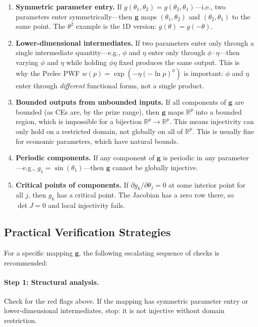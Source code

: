 \documentclass[11pt,a4paper]{article}
\theoremstyle{definition}
\begin{document}
\begin{enumerate}
    \item \textbf{Symmetric parameter entry.} If $g(\theta_1, \theta_2) =
    g(\theta_2, \theta_1)$---i.e., two parameters enter symmetrically---then
    $\mathbf{g}$ maps $(\theta_1, \theta_2)$ and $(\theta_2, \theta_1)$ to the
    same point. The $\theta^2$ example is the 1D version: $g(\theta) = g(-\theta)$.

    \item \textbf{Lower-dimensional intermediates.} If two parameters enter
    only through a single intermediate quantity---e.g., $\phi$ and $\eta$ enter
    only through $\phi \cdot \eta$---then varying $\phi$ and $\eta$ while holding
    $\phi\eta$ fixed produces the same output. This is why the Prelec PWF
    $w(p) = \exp(-\eta(-\ln p)^\phi)$ is important: $\phi$ and $\eta$ enter
    through \emph{different} functional forms, not a single product.

    \item \textbf{Bounded outputs from unbounded inputs.} If all components of
    $\mathbf{g}$ are bounded (as CEs are, by the prize range), then
    $\mathbf{g}$ maps $\mathbb{R}^p$ into a bounded region, which is
    impossible for a bijection $\mathbb{R}^p \to \mathbb{R}^p$. This means
    injectivity can only hold on a restricted domain, not globally on all of
    $\mathbb{R}^p$. This is usually fine for economic parameters, which have
    natural bounds.

    \item \textbf{Periodic components.} If any component of $\mathbf{g}$ is
    periodic in any parameter---e.g., $g_1 = \sin(\theta_1)$---then
    $\mathbf{g}$ cannot be globally injective.

    \item \textbf{Critical points of components.} If $\partial g_k / \partial
    \theta_j = 0$ at some interior point for all $j$, then $g_k$ has a critical
    point. The Jacobian has a zero row there, so $\det J = 0$ and local
    injectivity fails.
\end{enumerate}


\subsection{Practical Verification Strategies}

For a specific mapping $\mathbf{g}$, the following escalating sequence of
checks is recommended:

\paragraph{Step 1: Structural analysis.} Check for the red flags above. If the
mapping has symmetric parameter entry or lower-dimensional intermediates, stop:
it is not injective without domain restriction.
\end{document}
